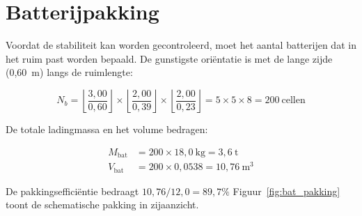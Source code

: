 \section{Batterijpakking}
\label{sec:batterijen}

Voordat de stabiliteit kan worden gecontroleerd, moet het aantal batterijen
dat in het ruim past worden bepaald. De gunstigste oriëntatie is met de
lange zijde (0{,}60~m) langs de ruimlengte:

\begin{equation}
    N_b = \left\lfloor \frac{3{,}00}{0{,}60} \right\rfloor \times
          \left\lfloor \frac{2{,}00}{0{,}39} \right\rfloor \times
          \left\lfloor \frac{2{,}00}{0{,}23} \right\rfloor
        = 5 \times 5 \times 8 = \boxed{200\ \text{cellen}}
    \label{eq:Nb}
\end{equation}

De totale ladingmassa en het volume bedragen:

\begin{align}
    M_\mathrm{bat} &= 200 \times 18{,}0\ \mathrm{kg} = \boxed{3{,}6\ \mathrm{t}}
    \label{eq:Mbat} \\[4pt]
    V_\mathrm{bat} &= 200 \times 0{,}0538 = 10{,}76\ \mathrm{m^3}
\end{align}

De pakkingsefficiëntie bedraagt $10{,}76/12{,}0 = 89{,}7\%$ Figuur~\ref{fig:bat_pakking} toont de schematische pakking in zijaanzicht.

